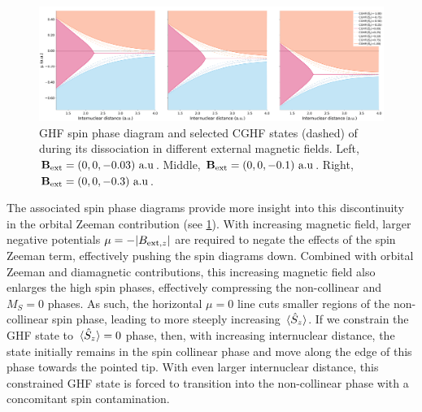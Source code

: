 \documentclass[journal=jctc,manuscript=article]{achemso}
\begin{document}
        \begin{figure}
            \centering
            \includegraphics[width=\textwidth]{GHF-spin-phase-diagram(H2)}
            \caption{
                GHF spin phase diagram and selected CGHF states (dashed) of  during its dissociation in different external magnetic fields.
                Left, $\vb{B}_{\text{ext}} = (0,0,-0.03)\text{ a.u}$.
                Middle, $\vb{B}_{\text{ext}} = (0,0,-0.1)\text{ a.u}$.
                Right, $\vb{B}_{\text{ext}} = (0,0,-0.3)\text{ a.u}$.
            }
            \label{fig:GHF-spin-phase-diagram(H2)}
        \end{figure}


        The associated spin phase diagrams provide more insight into this discontinuity in the orbital Zeeman contribution (see \cref{fig:GHF-spin-phase-diagram(H2)}). 
        With increasing magnetic field, larger negative potentials $\mu = - \abs{B_{\text{ext}, z}}$ are required to negate the effects of the spin Zeeman term, effectively pushing the spin diagrams down. 
        Combined with orbital Zeeman and diamagnetic contributions, this increasing magnetic field also enlarges the high spin phases, effectively compressing the non-collinear and $M_S=0$ phases.
        As such, the horizontal $\mu=0$ line cuts smaller regions of the non-collinear spin phase, leading to more steeply increasing $\ev*{\hat{S}_z}$.
        If we constrain the GHF state to $\ev*{\hat{S}_z}=0$ phase, then, with increasing internuclear distance, the state initially remains in the spin collinear phase and move along the edge of this phase towards the pointed tip.
        With even larger internuclear distance, this constrained GHF state is forced to transition into the non-collinear phase with a concomitant spin contamination.
\end{document}
